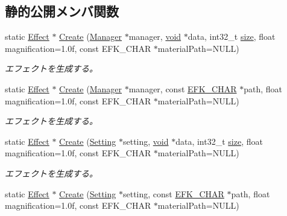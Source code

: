 \subsection*{静的公開メンバ関数}
\begin{DoxyCompactItemize}
\item 
static \mbox{\hyperlink{class_effekseer_1_1_effect}{Effect}} $\ast$ \mbox{\hyperlink{class_effekseer_1_1_effect_a405ce55b658846f21963f39d8f4bda12}{Create}} (\mbox{\hyperlink{class_effekseer_1_1_manager}{Manager}} $\ast$manager, \mbox{\hyperlink{namespace_effekseer_ab34c4088e512200cf4c2716f168deb56}{void}} $\ast$data, int32\+\_\+t \mbox{\hyperlink{namespace_effekseer_a73c68f3d33539d30844b9d1e058077f7}{size}}, float magnification=1.\+0f, const E\+F\+K\+\_\+\+C\+H\+A\+R $\ast$material\+Path=\+N\+U\+L\+L)
\begin{DoxyCompactList}\small\item\em エフェクトを生成する。 \end{DoxyCompactList}\item 
static \mbox{\hyperlink{class_effekseer_1_1_effect}{Effect}} $\ast$ \mbox{\hyperlink{class_effekseer_1_1_effect_ace21c8a6f826d2ddd167b582a996f0b7}{Create}} (\mbox{\hyperlink{class_effekseer_1_1_manager}{Manager}} $\ast$manager, const \mbox{\hyperlink{_effekseer_8h_aca7eb5de6dd019c19ac58ea35a193f2f}{E\+F\+K\+\_\+\+C\+H\+AR}} $\ast$path, float magnification=1.\+0f, const E\+F\+K\+\_\+\+C\+H\+A\+R $\ast$material\+Path=\+N\+U\+L\+L)
\begin{DoxyCompactList}\small\item\em エフェクトを生成する。 \end{DoxyCompactList}\item 
static \mbox{\hyperlink{class_effekseer_1_1_effect}{Effect}} $\ast$ \mbox{\hyperlink{class_effekseer_1_1_effect_adc51450e8263a3d2dacfa361ec6526f2}{Create}} (\mbox{\hyperlink{class_effekseer_1_1_setting}{Setting}} $\ast$setting, \mbox{\hyperlink{namespace_effekseer_ab34c4088e512200cf4c2716f168deb56}{void}} $\ast$data, int32\+\_\+t \mbox{\hyperlink{namespace_effekseer_a73c68f3d33539d30844b9d1e058077f7}{size}}, float magnification=1.\+0f, const E\+F\+K\+\_\+\+C\+H\+A\+R $\ast$material\+Path=\+N\+U\+L\+L)
\begin{DoxyCompactList}\small\item\em エフェクトを生成する。 \end{DoxyCompactList}\item 
static \mbox{\hyperlink{class_effekseer_1_1_effect}{Effect}} $\ast$ \mbox{\hyperlink{class_effekseer_1_1_effect_ac2d94c1b993a8ff1a6fe5b53a86b7965}{Create}} (\mbox{\hyperlink{class_effekseer_1_1_setting}{Setting}} $\ast$setting, const \mbox{\hyperlink{_effekseer_8h_aca7eb5de6dd019c19ac58ea35a193f2f}{E\+F\+K\+\_\+\+C\+H\+AR}} $\ast$path, float magnification=1.\+0f, const E\+F\+K\+\_\+\+C\+H\+A\+R $\ast$material\+Path=\+N\+U\+L\+L)

\end{DoxyCompactItemize}
